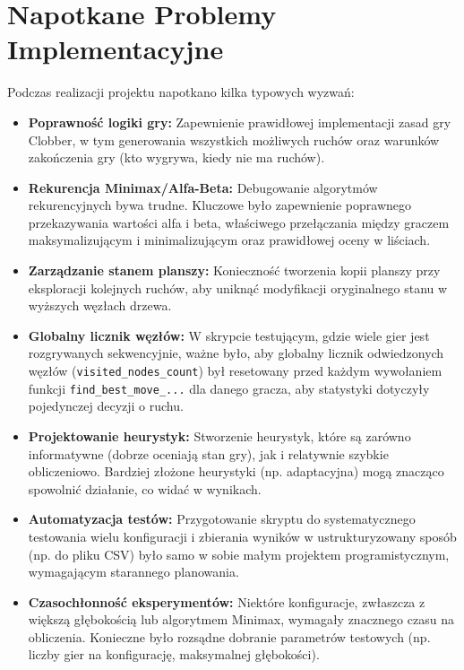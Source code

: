 \documentclass[12pt,a4paper]{article}
\newcommand{\code}[1]{\texttt{#1}} %
\begin{document}
\section{Napotkane Problemy Implementacyjne}
Podczas realizacji projektu napotkano kilka typowych wyzwań:
\begin{itemize}
    \item \textbf{Poprawność logiki gry:} Zapewnienie prawidłowej implementacji zasad gry Clobber, w tym generowania wszystkich możliwych ruchów oraz warunków zakończenia gry (kto wygrywa, kiedy nie ma ruchów).
    \item \textbf{Rekurencja Minimax/Alfa-Beta:} Debugowanie algorytmów rekurencyjnych bywa trudne. Kluczowe było zapewnienie poprawnego przekazywania wartości alfa i beta, właściwego przełączania między graczem maksymalizującym i minimalizującym oraz prawidłowej oceny w liściach.
    \item \textbf{Zarządzanie stanem planszy:} Konieczność tworzenia kopii planszy przy eksploracji kolejnych ruchów, aby uniknąć modyfikacji oryginalnego stanu w wyższych węzłach drzewa.
    \item \textbf{Globalny licznik węzłów:} W skrypcie testującym, gdzie wiele gier jest rozgrywanych sekwencyjnie, ważne było, aby globalny licznik odwiedzonych węzłów (\code{visited\_nodes\_count}) był resetowany przed każdym wywołaniem funkcji \code{find\_best\_move\_...} dla danego gracza, aby statystyki dotyczyły pojedynczej decyzji o ruchu.
    \item \textbf{Projektowanie heurystyk:} Stworzenie heurystyk, które są zarówno informatywne (dobrze oceniają stan gry), jak i relatywnie szybkie obliczeniowo. Bardziej złożone heurystyki (np. adaptacyjna) mogą znacząco spowolnić działanie, co widać w wynikach.
    \item \textbf{Automatyzacja testów:} Przygotowanie skryptu do systematycznego testowania wielu konfiguracji i zbierania wyników w ustrukturyzowany sposób (np. do pliku CSV) było samo w sobie małym projektem programistycznym, wymagającym starannego planowania.
    \item \textbf{Czasochłonność eksperymentów:} Niektóre konfiguracje, zwłaszcza z większą głębokością lub algorytmem Minimax, wymagały znacznego czasu na obliczenia. Konieczne było rozsądne dobranie parametrów testowych (np. liczby gier na konfigurację, maksymalnej głębokości).
\end{itemize}
\end{document}
